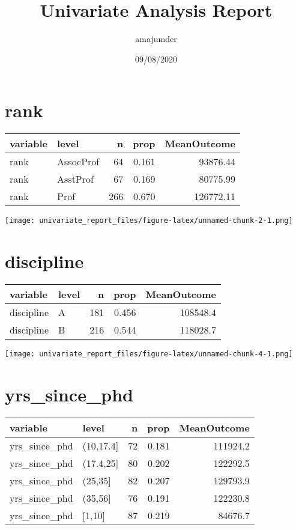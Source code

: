 \documentclass[
]{article}
\title{Univariate Analysis Report}
\author{amajumder}
\date{09/08/2020}
\begin{document}
\maketitle

\hypertarget{rank}{%
\section{rank}\label{rank}}

\begin{longtable}[]{@{}llrrr@{}}
\toprule
variable & level & n & prop & MeanOutcome\tabularnewline
\midrule
\endhead
rank & AssocProf & 64 & 0.161 & 93876.44\tabularnewline
rank & AsstProf & 67 & 0.169 & 80775.99\tabularnewline
rank & Prof & 266 & 0.670 & 126772.11\tabularnewline
\bottomrule
\end{longtable}

\texttt{[image: univariate\_report\_files/figure-latex/unnamed-chunk-2-1.png]}

\hypertarget{discipline}{%
\section{discipline}\label{discipline}}

\begin{longtable}[]{@{}llrrr@{}}
\toprule
variable & level & n & prop & MeanOutcome\tabularnewline
\midrule
\endhead
discipline & A & 181 & 0.456 & 108548.4\tabularnewline
discipline & B & 216 & 0.544 & 118028.7\tabularnewline
\bottomrule
\end{longtable}

\texttt{[image: univariate\_report\_files/figure-latex/unnamed-chunk-4-1.png]}

\hypertarget{yrs_since_phd}{%
\section{yrs\_since\_phd}\label{yrs_since_phd}}

\begin{longtable}[]{@{}llrrr@{}}
\toprule
variable & level & n & prop & MeanOutcome\tabularnewline
\midrule
\endhead
yrs\_since\_phd & (10,17.4{]} & 72 & 0.181 & 111924.2\tabularnewline
yrs\_since\_phd & (17.4,25{]} & 80 & 0.202 & 122292.5\tabularnewline
yrs\_since\_phd & (25,35{]} & 82 & 0.207 & 129793.9\tabularnewline
yrs\_since\_phd & (35,56{]} & 76 & 0.191 & 122230.8\tabularnewline
yrs\_since\_phd & {[}1,10{]} & 87 & 0.219 & 84676.7\tabularnewline
\bottomrule
\end{longtable}
\end{document}
